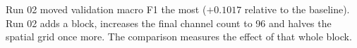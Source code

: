 Run 02 moved validation macro F1 the most ($+0.1017$ relative to the baseline). Run 02 adds a block, increases the final channel count to 96 and halves the spatial grid once more. The comparison measures the effect of that whole block.

